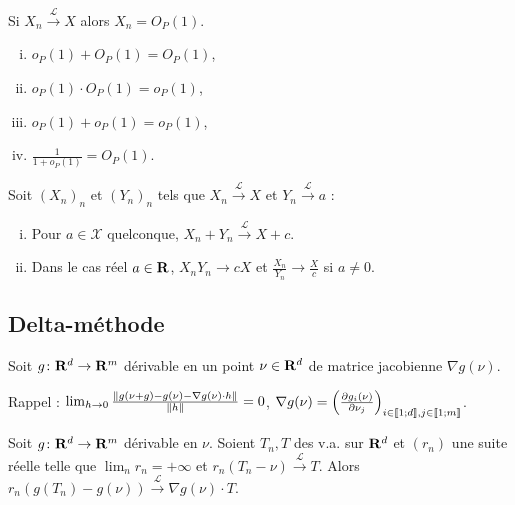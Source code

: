 	\begin{pop}
		Si $X_n \overset{\mathcal{L}}{\longrightarrow} X$ alors $X_n = O_P(1)$.
	\end{pop}

	\begin{pop}
		\begin{enumerate}[(i)]
			\item $o_P(1) + O_P(1) = O_P(1)$,
			\item $o_P(1) \cdot O_P(1) = o_P(1)$,
			\item $o_P(1) + o_P(1) = o_P(1)$,
			\item $\frac{1}{1 + o_P(1)} = O_P(1)$.
		\end{enumerate}
	\end{pop}

	\begin{lem}
		Soit $(X_n)_n$ et $(Y_n)_n$ tels que $X_n \overset{\mathcal{L}}{\longrightarrow} X$ et $Y_n \overset{\mathcal{L}}{\longrightarrow} a$ :
		\begin{enumerate}[(i)]
			\item Pour $a \in \mathcal{X}$ quelconque, $X_n + Y_n \overset{\mathcal{L}}{\longrightarrow} X + c$.
			\item Dans le cas réel $a \in \mathbf{R}$, $X_n Y_n \longrightarrow cX$ et $\frac{X_n}{Y_n} \longrightarrow \frac{X}{c}$ si $a \neq 0$.
		\end{enumerate}
	\end{lem}


\subsection{Delta-méthode}

	Soit $g \colon \mathbf{R}^d \to \mathbf{R}^m$ dérivable en un point $\nu \in \mathbf{R}^d$ de matrice jacobienne $\nabla g(\nu)$.

	Rappel : $\lim_{h \to 0} \frac{\left\lVert g(\nu + g) - g(\nu) - \nabla g(\nu) \cdot h\right\rVert}{\left\lVert h\right\rVert} = 0$, $\nabla g(\nu) = \left( \frac{\partial g_i(\nu)}{\partial \nu_j} \right)_{i \in \mathopen{}\mathclose{\left[\![1\mathclose{}\mathpunct{};d\right]\!]}, j \in \mathopen{}\mathclose{\left[\![1\mathclose{}\mathpunct{};m\right]\!]}}$.

	\begin{thm}
		Soit $g \colon \mathbf{R}^d \to \mathbf{R}^m$ dérivable en $\nu$.
		Soient $T_n, T$ des v.a. sur $\mathbf{R}^d$ et $(r_n)$ une suite réelle telle que $\lim_n r_n = +\infty$ et $r_n(T_n - \nu) \overset{\mathcal{L}}{\longrightarrow} T$.
		Alors $r_n(g(T_n) - g(\nu)) \overset{\mathcal{L}}{\longrightarrow} \nabla g(\nu) \cdot T$.
	\end{thm}

